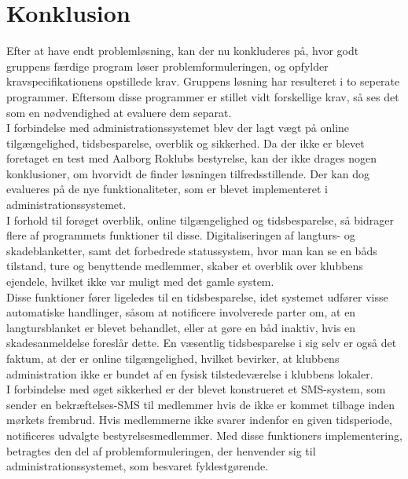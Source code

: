 
\chapter{Konklusion}
\label{sec:konklusion}
Efter at have endt problemløsning, kan der nu konkluderes på, hvor godt gruppens færdige program løser problemformuleringen, og opfylder kravspecifikationens opstillede krav. Gruppens løsning har resulteret i to seperate programmer. Eftersom disse programmer er stillet vidt forskellige krav, så ses det som en nødvendighed at evaluere dem separat. \\

I forbindelse med administrationssystemet blev der lagt vægt på online tilgængelighed, tidsbesparelse, overblik og sikkerhed. Da der ikke er blevet foretaget en test med Aalborg Roklubs bestyrelse, kan der ikke drages nogen konklusioner, om hvorvidt de finder løsningen tilfredsstillende. Der kan dog evalueres på de nye funktionaliteter, som er blevet implementeret i administrationssystemet. \\

I forhold til forøget overblik, online tilgængelighed og tidsbesparelse, så bidrager flere af programmets funktioner til disse. Digitaliseringen af langturs- og skadeblanketter, samt det forbedrede statussystem, hvor man kan se en båds tilstand, ture og benyttende medlemmer, skaber et overblik over klubbens ejendele, hvilket ikke var muligt med det gamle system. \\

Disse funktioner fører ligeledes til en tidsbesparelse, idet systemet udfører visse automatiske handlinger, såsom at notificere involverede parter om, at en langtursblanket er blevet behandlet, eller at gøre en båd inaktiv, hvis en skadesanmeldelse foreslår dette. En væsentlig tidsbesparelse i sig selv er også det faktum, at der er online tilgængelighed, hvilket bevirker, at klubbens administration ikke er bundet af en fysisk tilstedeværelse i klubbens lokaler.\\

I forbindelse med øget sikkerhed er der blevet konstrueret et SMS-system, som sender en bekræftelses-SMS til medlemmer hvis de ikke er kommet tilbage inden mørkets frembrud. Hvis medlemmerne ikke svarer indenfor en given tidsperiode, notificeres udvalgte bestyrelsesmedlemmer. Med disse funktioners implementering, betragtes den del af problemformuleringen, der henvender sig til administrationssystemet, som besvaret fyldestgørende. \\

